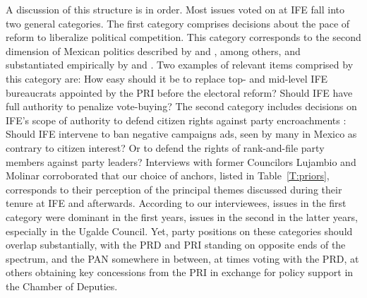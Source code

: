 \documentclass[12 pt, letter]{article}
\begin{document}
A discussion of this structure is in order. Most issues voted on at IFE fall into two general categories. The first category comprises decisions about the pace of reform to liberalize political competition. This category corresponds to the second dimension of Mexican politics described by \citet{Molinar1991} and \citet{Lujambio2001}, among others, and substantiated empirically by \citet{Moreno2003a} and \citet{Magaloni2006}.  Two examples of relevant items comprised by this category are: How easy should it be to replace top- and mid-level IFE bureaucrats appointed by the PRI before the electoral reform? Should IFE have full authority to penalize vote-buying?  The second category includes decisions on IFE's scope of authority to defend citizen rights against party encroachments \citep[cf.][]{Cardenas2004}: Should IFE intervene to ban negative campaigns ads, seen by many in Mexico as contrary to citizen interest? Or to defend the rights of rank-and-file party members against party leaders? Interviews with former Councilors Lujambio and Molinar corroborated that our choice of anchors, listed in Table~\ref{T:priors}, corresponds  to their perception of the principal themes discussed during their tenure at IFE and afterwards.  According to our interviewees, issues in the first category were dominant in the first years, issues in the second in the latter years, especially in the Ugalde Council. Yet, party positions on these  categories should overlap substantially, with the PRD and PRI standing on opposite ends of the spectrum, and the PAN somewhere in between, at times voting with the PRD, at others obtaining key concessions from the PRI in exchange for policy support in the Chamber of Deputies.

\end{document}
